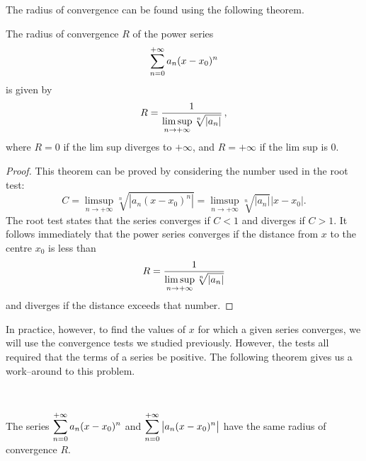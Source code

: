 The radius of convergence can be found using the following theorem.

\begin{theorem}\label{thm:cauchy}
The radius of convergence $R$ of the power series
$$\displaystyle \sum_{n=0}^{+\infty} a_n(x-x_0)^n$$
is given by
$$
\displaystyle R={\frac {1}{\displaystyle \limsup _{n\rightarrow +\infty }{\sqrt[{n}]{|a_{n}|}}}}\,,
$$
where $R= 0$ if the lim sup diverges to $+\infty$, and $R=+\infty$ if the lim sup is 0.
\end{theorem}

	\checkoddpage
{}

\begin{proof}
This theorem can be proved by considering the number used in the root test:
$$
\displaystyle C=\limsup _{n\rightarrow +\infty }{\sqrt[{n}]{|a_{n}(x-x_0)^{n}|}}=\limsup _{n\rightarrow +\infty }{\sqrt[{n}]{|a_{n}|}}|x-x_0|.
$$
The root test states that the series converges if $C < 1$ and diverges if $C > 1$. It follows immediately that the power series converges if the distance from $x$ to the centre $x_0$ is less than
$$
\displaystyle R={\frac {1}{\displaystyle \limsup _{n\rightarrow +\infty }{\sqrt[{n}]{|a_{n}|}}}}
$$
and diverges if the distance exceeds that number.
\end{proof}

\fi

In practice, however, to find the values of $x$ for which a given series converges, we will use the convergence tests we studied previously. However, the tests all required that the terms of a series be positive. The following theorem gives us a work--around to this problem.

\begin{theorem}\label{thm:abs_power}
{\footnotesize $\,$}\vspace*{-0.75cm}

	The series $\displaystyle \sum_{n=0}^{+\infty} a_n(x-x_0)^n$ and $\displaystyle \sum_{n=0}^{+\infty} \big|a_n(x-x_0)^n\big|$ have the same radius of convergence $R$.
\end{theorem}
\ifanalysis

